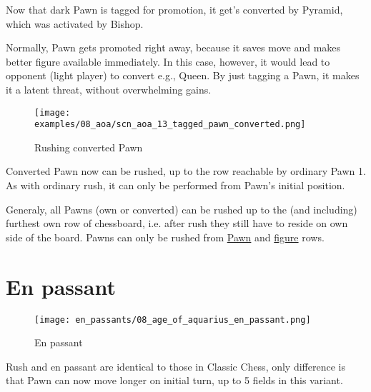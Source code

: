 Now that dark Pawn is tagged for promotion, it get's converted by Pyramid,
which was activated by Bishop.

Normally, Pawn gets promoted right away, because it saves move and makes better
figure available immediately. In this case, however, it would lead to opponent
(light player) to convert e.g., Queen. By just tagging a Pawn, it makes it a
latent threat, without overwhelming gains.

\clearpage %

\noindent
\begin{figure}[h]
\texttt{[image: examples/08\_aoa/scn\_aoa\_13\_tagged\_pawn\_converted.png]}
\caption{Rushing converted Pawn}
\label{fig:scn_aoa_13_tagged_pawn_converted}
\end{figure}

Converted Pawn now can be rushed, up to the row reachable by ordinary Pawn 1.
As with ordinary rush, it can only be performed from Pawn's initial position.

Generaly, all Pawns (own or converted) can be rushed up to the (and including)
furthest own row of chessboard, i.e. after rush they still have to reside on
own side of the board. Pawns can only be rushed from
\hyperref[sec:Terms/Pawn row]{Pawn} and \hyperref[sec:Terms/Figure row]{figure} rows.

\clearpage %

\section*{En passant}

\noindent
\begin{wrapfigure}{l}{0.4\textwidth}
\centering
\texttt{[image: en\_passants/08\_age\_of\_aquarius\_en\_passant.png]}
\caption{En passant}
\label{fig:08_age_of_aquarius_en_passant}
\end{wrapfigure}
Rush and en passant are identical to those in Classic Chess, only difference
is that Pawn can now move longer on initial turn, up to 5 fields in this
variant.

\clearpage %

